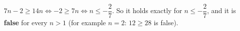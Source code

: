 $7n-2\ge14n\iff-2\ge7n\iff n\le-\dfrac27$. So it holds exactly for $n\le-\dfrac27$, and it is \textbf{false} for every $n>1$ (for example $n=2$: $12\ge28$ is false).
